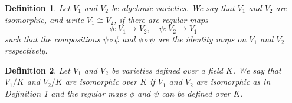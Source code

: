 \documentclass[12pt]{article}
\newtheorem{defn}{Definition}
\begin{document}
\begin{defn}
Let $V_1$ and $V_2$ be algebraic varieties. We say that $V_1$ and $V_2$ are isomorphic, and write $V_1 \cong V_2$, if there are regular maps $$\phi \colon V_1 \to V_2, \quad \psi\colon V_2 \to V_1$$
such that the compositions $\psi \circ \phi$ and $\phi \circ \psi$ are the identity maps on $V_1$ and $V_2$ respectively.
\end{defn}

\begin{defn}
Let $V_1$ and $V_2$ be varieties defined over a field $K$. We say that $V_1/K$ and $V_2/K$  are isomorphic over $K$ if $V_1$ and $V_2$ are isomorphic as in Definition 1 and the regular maps $\phi$ and $\psi$ can be defined over $K$.
\end{defn}
\end{document}
